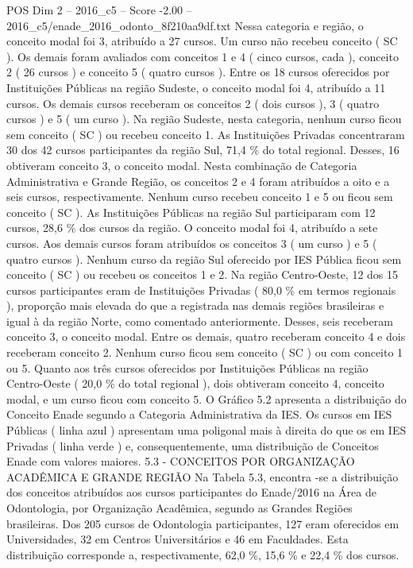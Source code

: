 \begin{textsample}{POS Dim 2 – 2016\_c5 – Score -2.00 – 2016\_c5/enade\_2016\_odonto\_8f210aa9df.txt}
Nessa categoria e região, o conceito modal foi 3, atribuído a 27 cursos.
Um curso não recebeu conceito ( SC ).
Os demais foram avaliados com conceitos 1 e 4 ( cinco cursos, cada ), conceito 2 ( 26 cursos ) e conceito 5 ( quatro cursos ).
Entre os 18 cursos oferecidos por Instituições Públicas na região Sudeste, o conceito modal foi 4, atribuído a 11 cursos.
Os demais cursos receberam os conceitos 2 ( dois cursos ), 3 ( quatro cursos ) e 5 ( um curso ).
Na região Sudeste, nesta categoria, nenhum curso ficou sem conceito ( SC ) ou recebeu conceito 1.
As Instituições Privadas concentraram 30 dos 42 cursos participantes da região Sul, 71,4 \% do total regional.
Desses, 16 obtiveram conceito 3, o conceito modal.
Nesta combinação de Categoria Administrativa e Grande Região, os conceitos 2 e 4 foram atribuídos a oito e a seis cursos, respectivamente.
Nenhum curso recebeu conceito 1 e 5 ou ficou sem conceito ( SC ).
As Instituições Públicas na região Sul participaram com 12 cursos, 28,6 \% dos cursos da região.
O conceito modal foi 4, atribuído a sete cursos.
Aos demais cursos foram atribuídos os conceitos 3 ( um curso ) e 5 ( quatro cursos ).
Nenhum curso da região Sul oferecido por IES Pública ficou sem conceito ( SC ) ou recebeu os conceitos 1 e 2.
Na região Centro-Oeste, 12 dos 15 cursos participantes eram de Instituições Privadas ( 80,0 \% em termos regionais ), proporção mais elevada do que a registrada nas demais regiões brasileiras e igual à da região Norte, como comentado anteriormente.
Desses, seis receberam conceito 3, o conceito modal.
Entre os demais, quatro receberam conceito 4 e dois receberam conceito 2.
Nenhum curso ficou sem conceito ( SC ) ou com conceito 1 ou 5.
Quanto aos três cursos oferecidos por Instituições Públicas na região Centro-Oeste ( 20,0 \% do total regional ), dois obtiveram conceito 4, conceito modal, e um curso ficou com conceito 5.
O Gráfico 5.2 apresenta a distribuição do Conceito Enade segundo a Categoria Administrativa da IES.
Os cursos em IES Públicas ( linha azul ) apresentam uma poligonal mais à direita do que os em IES Privadas ( linha verde ) e, consequentemente, uma distribuição de Conceitos Enade com valores maiores. 5.3 - CONCEITOS POR ORGANIZAÇÃO ACADÊMICA E GRANDE REGIÃO Na Tabela 5.3, encontra -se a distribuição dos conceitos atribuídos aos cursos participantes do Enade/2016 na Área de Odontologia, por Organização Acadêmica, segundo as Grandes Regiões brasileiras.
Dos 205 cursos de Odontologia participantes, 127 eram oferecidos em Universidades, 32 em Centros Universitários e 46 em Faculdades.
Esta distribuição corresponde a, respectivamente, 62,0 \%, 15,6 \% e 22,4 \% dos cursos.

\end{textsample}
